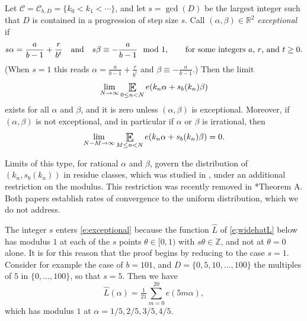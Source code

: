 \begin{lemma}  \label{l;irrational} 
Let $\mathcal{C} = \mathcal{C}_{b,D}=\{k_0<k_1<\cdots\}$, 
and let $s=\gcd(D)$ be the largest integer such that $D$ is contained in a progression of step size $s$. 
Call $(\alpha,\beta)\in\mathbb{R}^2$ \emph{exceptional} if 
\begin{equation}\label{e:exceptional}
s\alpha = \frac{a}{b-1}+\frac {r}{b^t} \quad\textup{and}\quad s\beta \equiv - \frac{a}{b-1} \mod 1, 
\qquad \textup{for some integers $a$, $r$, and $t\geq 0$.}
\end{equation}
(When $s=1$ this reads $\alpha = \frac{a}{b-1}+\frac {r}{b^t}$ and $\beta \equiv - \frac{a}{b-1}$.) 
Then the  limit 
\begin{equation}\label{ee:limit}
\lim _{N\to \infty} \Expectation 
_{0\leq n<N} e(k_n \alpha + s_b(k_n)\beta )
\end{equation}
exists for all $\alpha $ and $\beta $, and it is zero unless $(\alpha,\beta)$ is exceptional. 
Moreover, if $(\alpha,\beta)$ is not exceptional, and in particular if $\alpha $ or $\beta $ is irrational,   then   
\begin{equation} \label{e:uniformLimitExponentials} 
\lim _{N-M\to \infty} \Expectation 
_{ M\leq n<N} 
e(k_n \alpha + s_b(k_n)\beta )=0. 
\end{equation}
\end{lemma}

Limits of this type, for rational $\alpha$ and $\beta$, govern the distribution of $(k_n,s_b(k_n))$ in residue classes, which was studied in \cite{ERDOS199899}, under an additional restriction on the modulus. This restriction was recently removed in \cite{SAAVEDRA-ARAYA_2026}*{Theorem A}. 
Both papers establish rates of convergence to the uniform distribution, which we do not address.  


\begin{remark} The integer $s$ enters \eqref{e:exceptional} because the function $\widehat L$ of \eqref{e;widehatL} below has modulus $1$ at each of the $s$ points $\theta \in [0,1)$ with $s\theta \in \mathbb{Z}$, and not at $\theta =0$ alone. 
It is for this reason that the proof begins by reducing to the case $s=1$. 
Consider for example the case of $b = 101$, and $D=\{0,5,10,\ldots,100\}$ the multiples of $5$ in $\{0,\ldots,100\}$, so that $s=5$. 
Then we have 
\begin{equation}
\widehat L (\alpha )  = \tfrac 1{21} \sum_{m=0} ^{20} e ( 5m \alpha ) , 
\end{equation}
which has modulus $1$ at $\alpha = 1/5, 2/5, 3/5, 4/5$.  
\end{remark}




